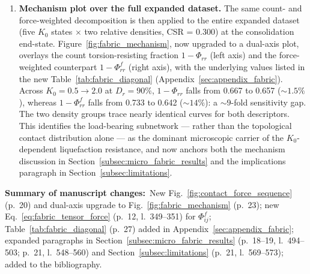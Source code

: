 \documentclass[11pt,a4paper]{article}
\newcommand{\changed}[1]{\par\noindent\textbf{Summary of manuscript changes:}\ #1\par}
\newcommand{\manref}[1]{(#1)}                  %
\newcommand{\Kzero}{\ensuremath{K_0}}
\begin{document}
\begin{enumerate}[leftmargin=*,label=(\arabic*),topsep=4pt,itemsep=6pt]
\item \textbf{Mechanism plot over the full expanded dataset.}
The same count- and force-weighted decomposition is then applied to
the entire expanded dataset (five \Kzero{} states $\times$ two
relative densities, CSR = 0.300) at the consolidation end-state.
Figure~\ref{fig:fabric_mechanism}, now upgraded to a dual-axis plot,
overlays the count torsion-resisting fraction $1-\Phi_{rr}$ (left
axis) and the force-weighted counterpart $1-\Phi^f_{rr}$ (right
axis), with the underlying values listed in the new
Table~\ref{tab:fabric_diagonal} (Appendix~\ref{sec:appendix_fabric}).
Across $\Kzero=0.5\to 2.0$ at $D_r=90\%$, $1-\Phi_{rr}$ falls from
0.667 to 0.657 ($\sim 1.5\%$), whereas $1-\Phi^f_{rr}$ falls from
0.733 to 0.642 ($\sim 14\%$): a $\sim 9$-fold sensitivity gap. The
two density groups trace nearly identical curves for both
descriptors. This identifies the load-bearing subnetwork — rather
than the topological contact distribution alone — as the dominant
microscopic carrier of the \Kzero{}-dependent liquefaction
resistance, and now anchors both the mechanism discussion in
Section~\ref{subsec:micro_fabric_results} and the implications
paragraph in Section~\ref{subsec:limitations}.
\end{enumerate}

\changed{New Fig.~\ref{fig:contact_force_sequence} \manref{p.~20} and
dual-axis upgrade to Fig.~\ref{fig:fabric_mechanism} \manref{p.~23};
new Eq.~\eqref{eq:fabric_tensor_force} \manref{p.~12, l.~349--351} for
$\Phi^f_{ij}$; Table~\ref{tab:fabric_diagonal} \manref{p.~27} added
in Appendix~\ref{sec:appendix_fabric}; expanded paragraphs in
Section~\ref{subsec:micro_fabric_results}
\manref{p.~18--19, l.~494--503; p.~21, l.~548--560} and
Section~\ref{subsec:limitations} \manref{p.~21, l.~569--573};
\citet{Zhou2022} added to the bibliography.}
\end{document}
